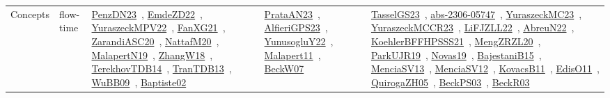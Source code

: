 {\begin{longtable}{lp{3cm}>{\raggedright\arraybackslash}p{6cm}>{\raggedright\arraybackslash}p{6cm}>{\raggedright\arraybackslash}p{8cm}}
Concepts & flow-time & \href{works/PenzDN23.pdf}{PenzDN23}~\cite{PenzDN23}, \href{works/EmdeZD22.pdf}{EmdeZD22}~\cite{EmdeZD22}, \href{works/YuraszeckMPV22.pdf}{YuraszeckMPV22}~\cite{YuraszeckMPV22}, \href{works/FanXG21.pdf}{FanXG21}~\cite{FanXG21}, \href{works/ZarandiASC20.pdf}{ZarandiASC20}~\cite{ZarandiASC20}, \href{works/NattafM20.pdf}{NattafM20}~\cite{NattafM20}, \href{works/MalapertN19.pdf}{MalapertN19}~\cite{MalapertN19}, \href{works/ZhangW18.pdf}{ZhangW18}~\cite{ZhangW18}, \href{works/TerekhovTDB14.pdf}{TerekhovTDB14}~\cite{TerekhovTDB14}, \href{works/TranTDB13.pdf}{TranTDB13}~\cite{TranTDB13}, \href{works/WuBB09.pdf}{WuBB09}~\cite{WuBB09}, \href{works/Baptiste02.pdf}{Baptiste02}~\cite{Baptiste02} & \href{works/PrataAN23.pdf}{PrataAN23}~\cite{PrataAN23}, \href{works/AlfieriGPS23.pdf}{AlfieriGPS23}~\cite{AlfieriGPS23}, \href{works/YunusogluY22.pdf}{YunusogluY22}~\cite{YunusogluY22}, \href{works/Malapert11.pdf}{Malapert11}~\cite{Malapert11}, \href{works/BeckW07.pdf}{BeckW07}~\cite{BeckW07} & \href{works/TasselGS23.pdf}{TasselGS23}~\cite{TasselGS23}, \href{works/abs-2306-05747.pdf}{abs-2306-05747}~\cite{abs-2306-05747}, \href{works/YuraszeckMC23.pdf}{YuraszeckMC23}~\cite{YuraszeckMC23}, \href{works/YuraszeckMCCR23.pdf}{YuraszeckMCCR23}~\cite{YuraszeckMCCR23}, \href{works/LiFJZLL22.pdf}{LiFJZLL22}~\cite{LiFJZLL22}, \href{works/AbreuN22.pdf}{AbreuN22}~\cite{AbreuN22}, \href{works/KoehlerBFFHPSSS21.pdf}{KoehlerBFFHPSSS21}~\cite{KoehlerBFFHPSSS21}, \href{works/MengZRZL20.pdf}{MengZRZL20}~\cite{MengZRZL20}, \href{works/ParkUJR19.pdf}{ParkUJR19}~\cite{ParkUJR19}, \href{works/Novas19.pdf}{Novas19}~\cite{Novas19}, \href{works/BajestaniB15.pdf}{BajestaniB15}~\cite{BajestaniB15}, \href{works/MenciaSV13.pdf}{MenciaSV13}~\cite{MenciaSV13}, \href{works/MenciaSV12.pdf}{MenciaSV12}~\cite{MenciaSV12}, \href{works/KovacsB11.pdf}{KovacsB11}~\cite{KovacsB11}, \href{works/EdisO11.pdf}{EdisO11}~\cite{EdisO11}, \href{works/QuirogaZH05.pdf}{QuirogaZH05}~\cite{QuirogaZH05}, \href{works/BeckPS03.pdf}{BeckPS03}~\cite{BeckPS03}, \href{works/BeckR03.pdf}{BeckR03}~\cite{BeckR03}\\

\end{longtable}}
